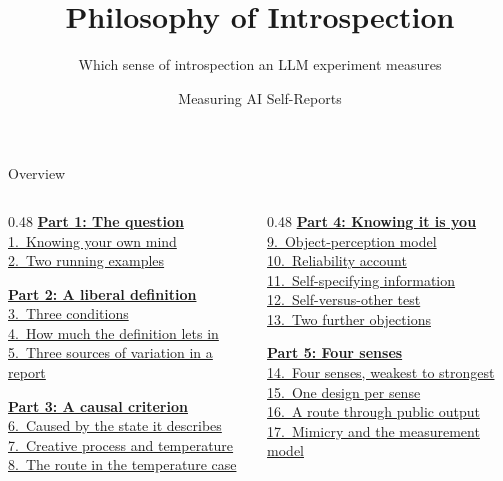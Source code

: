 \documentclass[aspectratio=169,11pt]{beamer}
\title{Philosophy of Introspection}
\subtitle{Which sense of introspection an LLM experiment measures}
\author{Measuring AI Self-Reports}
\date{}
\begin{document}
\begin{frame}
\vspace*{-0.6cm}\titlepage
\end{frame}

\begin{frame}{Overview}\footnotesize
\begin{columns}[T]
\begin{column}{0.48\textwidth}
\hyperlink{part1}{\textbf{Part 1: The question}}\\[0.15em]
{\scriptsize%
\quad\hyperlink{hungry}{1.~Knowing your own mind}\\%
\quad\hyperlink{examples}{2.~Two running examples}%
}\vspace{0.3em}

\hyperlink{part2}{\textbf{Part 2: A liberal definition}}\\[0.15em]
{\scriptsize%
\quad\hyperlink{kfdef}{3.~Three conditions}\\%
\quad\hyperlink{kfloose}{4.~How much the definition lets in}\\%
\quad\hyperlink{kfsources}{5.~Three sources of variation in a report}%
}\vspace{0.3em}

\hyperlink{part3}{\textbf{Part 3: A causal criterion}}\\[0.15em]
{\scriptsize%
\quad\hyperlink{causal}{6.~Caused by the state it describes}\\%
\quad\hyperlink{twocases}{7.~Creative process and temperature}\\%
\quad\hyperlink{temp}{8.~The route in the temperature case}%
}
\end{column}
\begin{column}{0.48\textwidth}
\hyperlink{part4}{\textbf{Part 4: Knowing it is you}}\\[0.15em]
{\scriptsize%
\quad\hyperlink{objperc}{9.~Object-perception model}\\%
\quad\hyperlink{reliab}{10.~Reliability account}\\%
\quad\hyperlink{selfspec}{11.~Self-specifying information}\\%
\quad\hyperlink{selfother}{12.~Self-versus-other test}\\%
\quad\hyperlink{further}{13.~Two further objections}%
}\vspace{0.3em}

\hyperlink{part5}{\textbf{Part 5: Four senses}}\\[0.15em]
{\scriptsize%
\quad\hyperlink{ladder}{14.~Four senses, weakest to strongest}\\%
\quad\hyperlink{designs}{15.~One design per sense}\\%
\quad\hyperlink{confound}{16.~A route through public output}\\%
\quad\hyperlink{measmodel}{17.~Mimicry and the measurement model}%
}\vspace{0.3em}


\end{column}
\end{columns}
\end{frame}
\end{document}

